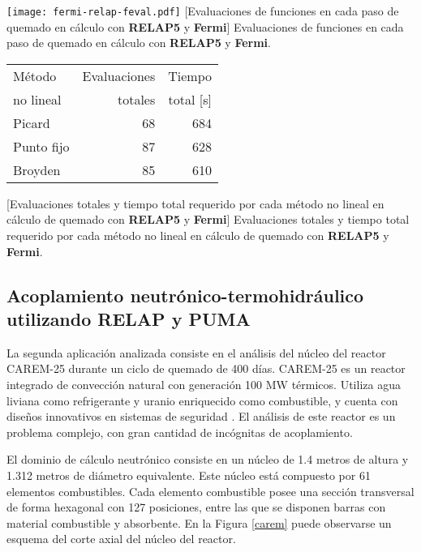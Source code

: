 \begin{minipage}{\textwidth}
\begin{minipage}[b]{0.49\textwidth}
  \centering
  \texttt{[image: fermi-relap-feval.pdf]}
  \label{fig-relap-fermi}
  \captionsetup{width=0.8\textwidth}
  [Evaluaciones de funciones en cada paso de quemado en cálculo con \textbf{RELAP5} y \textbf{Fermi}]
  {Evaluaciones de funciones en cada paso de quemado en cálculo con \textbf{RELAP5} y \textbf{Fermi}.}
\end{minipage}
\hfill
\begin{minipage}[b]{0.49\textwidth}
  \centering
  \begin{tabular}{ l r r } \hline
      Método & Evaluaciones & Tiempo \\
      no lineal & totales & total [s] \\ \hline %
      Picard & 68 & 684 \\ %
      Punto fijo & 87 & 628  \\ %
      Broyden & 85 & 610 \\ \hline
   \end{tabular}
   \label{tab-relap-fermi}
   \captionsetup{width=0.8\textwidth}
   [Evaluaciones totales y tiempo total requerido por cada método no lineal en cálculo de quemado con \textbf{RELAP5} y \textbf{Fermi}]
   {Evaluaciones totales y tiempo total requerido por cada método no lineal en cálculo de quemado con \textbf{RELAP5} y \textbf{Fermi}.}
  \end{minipage}
\end{minipage}

\subsection*{Acoplamiento neutrónico-termohidráulico utilizando RELAP y PUMA}
\label{3:relap-puma}

La segunda aplicación analizada consiste en el análisis del núcleo del reactor CAREM-25 \cite{carem} durante un ciclo de quemado de 400 días.
CAREM-25 es un reactor integrado de convección natural con generación 100 MW térmicos.
Utiliza agua liviana como refrigerante y uranio enriquecido como combustible, y
cuenta con diseños innovativos en sistemas de seguridad \cite{carem}.
El análisis de este reactor es un problema complejo, con gran cantidad de incógnitas de acoplamiento.

El dominio de cálculo neutrónico consiste en un núcleo de 1.4 metros de altura y 1.312 metros de diámetro equivalente.
Este núcleo está compuesto por 61 elementos combustibles.
Cada elemento combustible posee una sección transversal de forma hexagonal con 127 posiciones, entre las que se disponen barras con material combustible y absorbente.
En la Figura \ref{carem} puede observarse un esquema del corte axial del núcleo del reactor.

